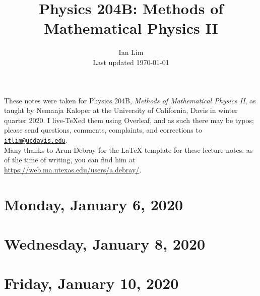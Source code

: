 \documentclass{../mynotes}
\begin{document}
\title{Physics 204B: Methods of Mathematical Physics II}
\author{Ian Lim\\ Last updated \today}
\maketitle
{\small\noindent These notes were taken for Physics 204B, \emph{Methods of Mathematical Physics II}, as taught by Nemanja Kaloper at the University of California, Davis in winter quarter 2020. I live-\TeX ed them using Overleaf, and as such there may be typos; please send questions, comments, complaints, and corrections to 
\href{mailto:itlim@ucdavis.edu?subject=204B\%20Lecture\%20Notes}{\texttt{itlim@ucdavis.edu}}.\\
Many thanks to Arun Debray for the {\LaTeX} template for these lecture notes: as of the time of writing, you can find him at \url{https://web.ma.utexas.edu/users/a.debray/}.}

\tableofcontents

\section{Monday, January 6, 2020}
	
\section{Wednesday, January 8, 2020}
    
\section{Friday, January 10, 2020}
    

% 	
%     
%     

%     
%     
\end{document}
